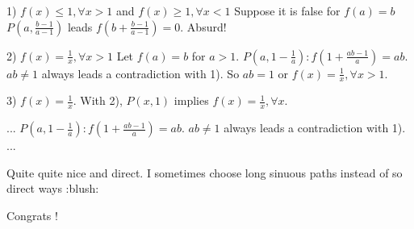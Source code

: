 \begin{solution}
	1) $f(x)\leq1,\forall x>1$ and $f(x)\geq1,\forall x<1$
Suppose it is false for $f(a)=b$ $P(a,\frac{b-1}{a-1})$ leads $f(b+\frac{b-1}{a-1})=0$. Absurd!


2) $f(x)=\frac1x,\forall x>1$
Let $f(a)=b$ for $a>1$.
$P(a,1-\frac1a): f(1+\frac{ab-1}a)=ab$.
$ab\neq1$ always leads a contradiction with 1). 
So $ab=1$ or $f(x)=\frac1x,\forall x>1$.

3) $f(x)=\frac1x$.
With 2), $P(x,1)$ implies $f(x)=\frac1x,\forall x$.
\end{solution}



\begin{solution}
	\begin{tcolorbox}...
$P(a,1-\frac1a): f(1+\frac{ab-1}a)=ab$.
$ab\neq1$ always leads a contradiction with 1). 
...\end{tcolorbox}
Quite quite nice and direct.
I sometimes choose long sinuous paths instead of so direct ways  :blush: 

Congrats !
\end{solution}



